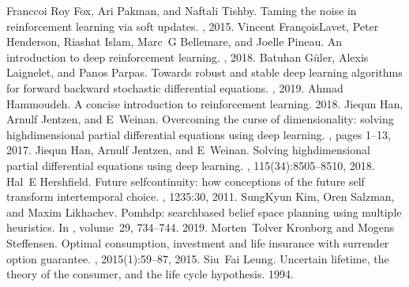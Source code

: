 \documentclass[letterpaper,10pt,english]{jupyterBook}
\begin{document}
\begin{sphinxthebibliography}{Franccoi}
\sphinxAtStartPar
Roy Fox, Ari Pakman, and Naftali Tishby. Taming the noise in reinforcement learning via soft updates. , 2015.
\sphinxAtStartPar
Vincent François\sphinxhyphen{}Lavet, Peter Henderson, Riashat Islam, Marc G Bellemare, and Joelle Pineau. An introduction to deep reinforcement learning. , 2018.
\sphinxAtStartPar
Batuhan Güler, Alexis Laignelet, and Panos Parpas. Towards robust and stable deep learning algorithms for forward backward stochastic differential equations. , 2019.
\sphinxAtStartPar
Ahmad Hammoudeh. A concise introduction to reinforcement learning. 2018.
\sphinxAtStartPar
Jiequn Han, Arnulf Jentzen, and E Weinan. Overcoming the curse of dimensionality: solving high\sphinxhyphen{}dimensional partial differential equations using deep learning. , pages 1–13, 2017.
\sphinxAtStartPar
Jiequn Han, Arnulf Jentzen, and E Weinan. Solving high\sphinxhyphen{}dimensional partial differential equations using deep learning. , 115(34):8505–8510, 2018.
\sphinxAtStartPar
Hal E Hershfield. Future self\sphinxhyphen{}continuity: how conceptions of the future self transform intertemporal choice. , 1235:30, 2011.
\sphinxAtStartPar
Sung\sphinxhyphen{}Kyun Kim, Oren Salzman, and Maxim Likhachev. Pomhdp: search\sphinxhyphen{}based belief space planning using multiple heuristics. In , volume 29, 734–744. 2019.
\sphinxAtStartPar
Morten Tolver Kronborg and Mogens Steffensen. Optimal consumption, investment and life insurance with surrender option guarantee. , 2015(1):59–87, 2015.
\sphinxAtStartPar
Siu Fai Leung. Uncertain lifetime, the theory of the consumer, and the life cycle hypothesis. 1994.
\sphinxAtStartPar
{}
\sphinxAtStartPar

\end{sphinxthebibliography}
\end{document}
